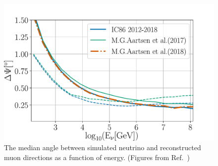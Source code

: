 \documentclass[aps,10pt,prd,twocolumn,floats,letterpaper,showpacs,nofootinbib,bibnotes,notitlepage,superscriptaddress,floatfix]{revtex4-1}
\begin{document}

\begin{figure}[t]
\centering
\includegraphics[width=0.48\linewidth,clip=true]{IC86II_PSF.pdf}
\caption[]{The median angle between simulated neutrino and reconstructed muon directions 
as a function of energy. (Figures from Ref.~\cite{Aartsen:2019fau})}\label{fig:PSF}
\end{figure}
\end{document}

